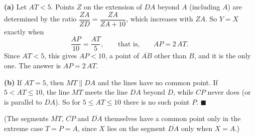 \textbf{(a)} Let $AT<5$. Points $Z$ on the extension of $DA$ beyond $A$ (including $A$) are determined by the ratio $\dfrac{ZA}{ZD}=\dfrac{ZA}{ZA+10}$, which increases with $ZA$. So $Y=X$ exactly when
\[\dfrac{AP}{10}=\dfrac{AT}{5},\qquad\text{that is,}\qquad AP=2\,AT.\]
Since $AT<5$, this gives $AP<10$, a point of $\overline{AB}$ other than $B$, and it is the only one. The answer is $\boxed{AP=2\,AT}$.

\textbf{(b)} If $AT=5$, then $MT\parallel DA$ and the lines have no common point. If $5<AT\le10$, the line $MT$ meets the line $DA$ beyond $D$, while $CP$ never does (or is parallel to $DA$). So for $5\le AT\le10$ there is no such point $P$. $\blacksquare$

(The segments $\overline{MT}$, $\overline{CP}$ and $\overline{DA}$ themselves have a common point only in the extreme case $T=P=A$, since $X$ lies on the segment $\overline{DA}$ only when $X=A$.)
